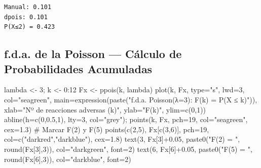 \documentclass[
  letterpaper,
  DIV=11,
  numbers=noendperiod]{scrartcl}
\newenvironment{Shaded}{\begin{snugshade}}{\end{snugshade}}
\newcommand{\AttributeTok}[1]{\textcolor[rgb]{0.40,0.45,0.13}{#1}}
\newcommand{\CommentTok}[1]{\textcolor[rgb]{0.37,0.37,0.37}{#1}}
\newcommand{\DecValTok}[1]{\textcolor[rgb]{0.68,0.00,0.00}{#1}}
\newcommand{\FloatTok}[1]{\textcolor[rgb]{0.68,0.00,0.00}{#1}}
\newcommand{\FunctionTok}[1]{\textcolor[rgb]{0.28,0.35,0.67}{#1}}
\newcommand{\NormalTok}[1]{\textcolor[rgb]{0.00,0.23,0.31}{#1}}
\newcommand{\OtherTok}[1]{\textcolor[rgb]{0.00,0.23,0.31}{#1}}
\newcommand{\SpecialCharTok}[1]{\textcolor[rgb]{0.37,0.37,0.37}{#1}}
\newcommand{\StringTok}[1]{\textcolor[rgb]{0.13,0.47,0.30}{#1}}
\begin{document}
\begin{verbatim}
Manual: 0.101 
dpois: 0.101 
P(X≤2) = 0.423
\end{verbatim}

\subsection{f.d.a. de la Poisson --- Cálculo de Probabilidades
Acumuladas}\label{f.d.a.-de-la-poisson-calculo-de-probabilidades-acumuladas}

\begin{Shaded}
\begin{Highlighting}[]
\NormalTok{lambda }\OtherTok{\textless{}{-}} \DecValTok{3}\NormalTok{; k }\OtherTok{\textless{}{-}} \DecValTok{0}\SpecialCharTok{:}\DecValTok{12}
\NormalTok{Fx }\OtherTok{\textless{}{-}} \FunctionTok{ppois}\NormalTok{(k, lambda)}
\FunctionTok{plot}\NormalTok{(k, Fx, }\AttributeTok{type=}\StringTok{"s"}\NormalTok{, }\AttributeTok{lwd=}\DecValTok{3}\NormalTok{, }\AttributeTok{col=}\StringTok{"seagreen"}\NormalTok{,}
     \AttributeTok{main=}\FunctionTok{expression}\NormalTok{(}\FunctionTok{paste}\NormalTok{(}\StringTok{"f.d.a. Poisson(λ=3): F(k) = P(X ≤ k)"}\NormalTok{)),}
     \AttributeTok{xlab=}\StringTok{"Nº de reacciones adversas (k)"}\NormalTok{, }\AttributeTok{ylab=}\StringTok{"F(k)"}\NormalTok{, }\AttributeTok{ylim=}\FunctionTok{c}\NormalTok{(}\DecValTok{0}\NormalTok{,}\DecValTok{1}\NormalTok{))}
\FunctionTok{abline}\NormalTok{(}\AttributeTok{h=}\FunctionTok{c}\NormalTok{(}\DecValTok{0}\NormalTok{,}\FloatTok{0.5}\NormalTok{,}\DecValTok{1}\NormalTok{), }\AttributeTok{lty=}\DecValTok{3}\NormalTok{, }\AttributeTok{col=}\StringTok{"grey"}\NormalTok{); }\FunctionTok{points}\NormalTok{(k, Fx, }\AttributeTok{pch=}\DecValTok{19}\NormalTok{, }\AttributeTok{col=}\StringTok{"seagreen"}\NormalTok{, }\AttributeTok{cex=}\FloatTok{1.3}\NormalTok{)}
\CommentTok{\# Marcar F(2) y F(5)}
\FunctionTok{points}\NormalTok{(}\FunctionTok{c}\NormalTok{(}\DecValTok{2}\NormalTok{,}\DecValTok{5}\NormalTok{), Fx[}\FunctionTok{c}\NormalTok{(}\DecValTok{3}\NormalTok{,}\DecValTok{6}\NormalTok{)], }\AttributeTok{pch=}\DecValTok{19}\NormalTok{, }\AttributeTok{col=}\FunctionTok{c}\NormalTok{(}\StringTok{"darkred"}\NormalTok{,}\StringTok{"darkblue"}\NormalTok{), }\AttributeTok{cex=}\FloatTok{1.8}\NormalTok{)}
\FunctionTok{text}\NormalTok{(}\DecValTok{3}\NormalTok{, Fx[}\DecValTok{3}\NormalTok{]}\SpecialCharTok{+}\FloatTok{0.05}\NormalTok{, }\FunctionTok{paste0}\NormalTok{(}\StringTok{"F(2) = "}\NormalTok{, }\FunctionTok{round}\NormalTok{(Fx[}\DecValTok{3}\NormalTok{],}\DecValTok{3}\NormalTok{)), }\AttributeTok{col=}\StringTok{"darkgreen"}\NormalTok{, }\AttributeTok{font=}\DecValTok{2}\NormalTok{)}
\FunctionTok{text}\NormalTok{(}\DecValTok{6}\NormalTok{, Fx[}\DecValTok{6}\NormalTok{]}\SpecialCharTok{+}\FloatTok{0.05}\NormalTok{, }\FunctionTok{paste0}\NormalTok{(}\StringTok{"F(5) = "}\NormalTok{, }\FunctionTok{round}\NormalTok{(Fx[}\DecValTok{6}\NormalTok{],}\DecValTok{3}\NormalTok{)), }\AttributeTok{col=}\StringTok{"darkblue"}\NormalTok{, }\AttributeTok{font=}\DecValTok{2}\NormalTok{)}
\end{Highlighting}
\end{Shaded}
\end{document}
